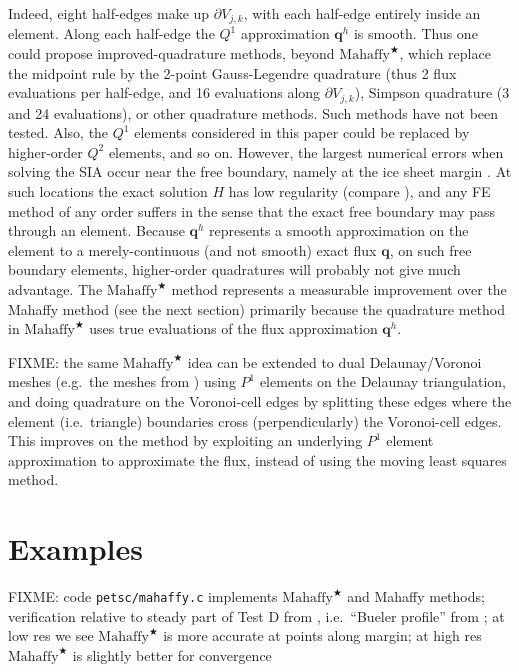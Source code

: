 \documentclass[twocolumn,letterpaper]{igs}
\newcommand\bq{\mathbf{q}}
\newcommand{\Mstar}{$\text{Mahaffy}^{\bigstar}$\xspace}
\begin{document}
Indeed, eight half-edges make up $\partial V_{j,k}$, with each half-edge entirely inside an element.  Along each half-edge the $Q^1$ approximation $\bq^h$ is smooth.  Thus one could propose improved-quadrature methods, beyond \Mstar, which replace the midpoint rule by the 2-point Gauss-Legendre quadrature (thus 2 flux evaluations per half-edge, and 16 evaluations along $\partial V_{j,k}$), Simpson quadrature (3 and 24 evaluations), or other quadrature methods.  Such methods have not been tested.  Also, the $Q^1$ elements considered in this paper could be replaced by higher-order $Q^2$ elements, and so on.  However, the largest numerical errors when solving the SIA occur near the free boundary, namely at the ice sheet margin \cite{Bueleretal2005}.  At such locations the exact solution $H$ has low regularity (compare \cite{JouvetBueler2012}), and any FE method of any order suffers in the sense that the exact free boundary may pass through an element.  Because $\bq^h$ represents a smooth approximation on the element to a merely-continuous (and not smooth) exact flux $\bq$, on such free boundary elements, higher-order quadratures will probably not give much advantage.  The \Mstar method represents a measurable improvement over the Mahaffy method (see the next section) primarily because the quadrature method in \Mstar uses true evaluations of the flux approximation $\bq^h$.

FIXME: the same \Mstar idea can be extended to dual Delaunay/Voronoi meshes (e.g.~the meshes from \cite{EgholmNielsen2010,Ringleretal2013}) using $P^1$ elements on the Delaunay triangulation, and doing quadrature on the Voronoi-cell edges by splitting these edges where the element (i.e.~triangle) boundaries cross (perpendicularly) the Voronoi-cell edges.  This improves on the \cite{EgholmNielsen2010} method by exploiting an underlying $P^1$ element approximation to approximate the flux, instead of using the moving least squares method.


\section{Examples} \label{sec:examples}

FIXME: code \texttt{petsc/mahaffy.c} implements \Mstar and Mahaffy methods; verification relative to steady part of Test D from \cite{Bueleretal2005}, i.e.~``Bueler profile'' from \cite{vanderVeen2013}; at low res we see \Mstar is more accurate at points along margin; at high res \Mstar is slightly better for convergence
\end{document}
